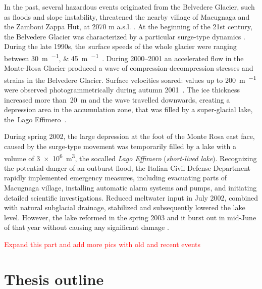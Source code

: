In the past, several hazardous events originated from the Belvedere Glacier, such as floods
and slope instability, threatened the nearby village of Macugnaga and the Zamboni Zappa
Hut, at 2070 m a.s.l. \citep{Kaab2004}.
At the beginning of the 21st century, the Belvedere Glacier was characterized by a
particular surge-type dynamics  \citep{Haeberli2002}.
During the late 1990s, the~surface speeds of the whole glacier were ranging between
\SIlist{30;45}{\meter\per\year}~\citep{Roethlisberger1985, Kaab2005}.
During 2000--2001 an accelerated flow in the Monte-Rosa Glacier produced a wave of
compression-decompression stresses and strains in the Belvedere Glacier.
Surface velocities soared: values up to \SI{200}{\meter\per\year} were observed
photogrammetrically during autumn 2001~\citep{Kaab2004}.
The ice thickness increased more than~\SI{20}{\meter} and the wave travelled downwards,
creating a depression area in the accumulation zone, that was filled by a super-glacial
lake, the~Lago Effimero~\citep{Haeberli2002, Mortara2009}.

During spring 2002, the large depression at the foot of the Monte Rosa east face, caused by the 
surge-type movement was temporarily filled by a lake with a volume of \SI{3e6}{\cubic\meter}, 
the socalled \textit{Lago Effimero} (\textit{short-lived lake}).
Recognizing the potential danger of an outburst flood, the Italian Civil Defense Department rapidly 
implemented emergency measures, including evacuating parts of Macugnaga village, installing automatic 
alarm systems and pumps, and initiating detailed scientific investigations. 
Reduced meltwater input in July 2002, combined with natural subglacial drainage, stabilized and subsequently 
lowered the lake level.
However, the lake reformed in the spring 2003 and it burst out in mid-June of that year without causing 
any significant damage \citep{Kaab2004}.

\textcolor{red}{Expand this part and add more pics with old and recent events}


\section{Thesis outline}

\makechapterbibliography{}